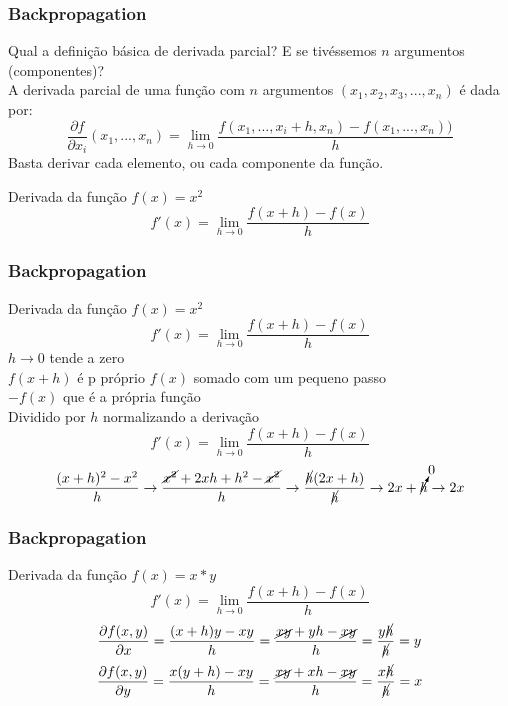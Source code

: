 \documentclass{beamer}
\begin{document}
\begin{frame}
	\frametitle{Backpropagation}
	\begin{block}{Qual a definição básica de derivada parcial?}
		E se tivéssemos $n$ argumentos (componentes)? \\
		A derivada parcial de uma função com $n$ argumentos $(x_1, x_2, x_3,...,x_n)$ é dada por:
		$$\frac{\partial f}{\partial x_i}(x_1,...,x_n) = \lim_{h \rightarrow 0} \frac{f(x_1, ...,x_i + h, x_n) - f (x_1, ..., x_n))}{h}$$
		Basta derivar cada elemento, ou cada componente da função.
	\end{block}
\begin{example}
	Derivada da função $f(x) = x^2$ \\
	$$f'(x) = \lim_{h \rightarrow 0} \frac{f(x + h)-f(x)}{h}$$
\end{example}
\end{frame}
\begin{frame}
	\frametitle{Backpropagation}
	\begin{example}
		Derivada da função $f(x) = x^2$ \\
		$$f'(x) = \lim_{h \rightarrow 0} \frac{f(x + h)-f(x)}{h}$$
		$h \rightarrow 0$ tende a zero \\
		$f(x + h)$ é p próprio $f(x)$ somado com um pequeno passo \\
		$- f(x)$ que é a própria função \\
		Dividido por $h$ normalizando a derivação \\
		$$f'(x) = \lim_{h \rightarrow 0} \frac{f(x + h)-f(x)}{h}$$
		\renewcommand{\CancelColor}{\color{red}}
		$$\frac{(x+h)^2 - x^2}{h} \rightarrow \frac{\cancel{x^2}+ 2xh +h^2 - \cancel{ x^2}}{h} \rightarrow \frac{\cancel{h}(2x + h)}{\cancel{h}} \rightarrow 2x+\cancelto{0}{h}  \rightarrow 2x$$
	\end{example}
\end{frame}
\begin{frame}
	\frametitle{Backpropagation}
	\begin{example}
		Derivada da função $f(x) = x*y$ \\
		$$f'(x) = \lim_{h \rightarrow 0} \frac{f(x + h)-f(x)}{h}$$
		\renewcommand{\CancelColor}{\color{red}}
		$$\frac{\partial f(x,y)}{\partial x} = \frac{(x+h)y - xy}{h} = \frac{\cancel{xy} + yh - \cancel{ xy}}{h} = \frac{y\cancel{h}}{\cancel{h}} = y$$
		$$\frac{\partial f(x,y)}{\partial y} = \frac{x(y+h) - xy}{h} = \frac{\cancel{xy} + xh - \cancel{ xy}}{h} = \frac{x\cancel{h}}{\cancel{h}} = x$$
	\end{example}
\end{frame}
\end{document}
